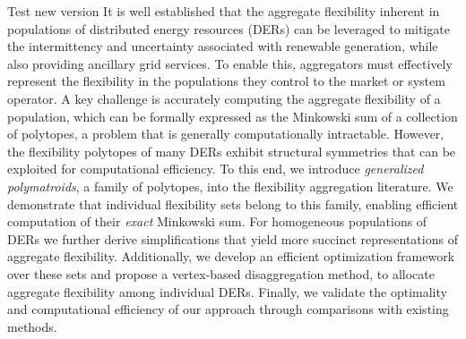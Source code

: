 Test new version It is well established that the aggregate flexibility inherent in populations of distributed energy resources (DERs) can be leveraged to mitigate the intermittency and uncertainty associated with renewable generation, while also providing ancillary grid services. To enable this, aggregators must effectively represent the flexibility in the populations they control to the market or system operator. A key challenge is accurately computing the aggregate flexibility of a population, which can be formally expressed as the Minkowski sum of a collection of polytopes, a problem that is generally computationally intractable. However, the flexibility polytopes of many DERs exhibit structural symmetries that can be exploited for computational efficiency. To this end, we introduce \textit{generalized polymatroids}, a family of polytopes, into the flexibility aggregation literature. We demonstrate that individual flexibility sets belong to this family, enabling efficient computation of their \textit{exact} Minkowski sum. For homogeneous populations of DERs we further derive simplifications that yield more succinct representations of aggregate flexibility. Additionally, we develop an efficient optimization framework over these sets and propose a vertex-based disaggregation method, to allocate aggregate flexibility among individual DERs. Finally, we validate the optimality and computational efficiency of our approach through comparisons with existing methods.